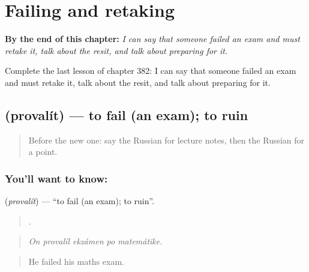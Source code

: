 
\chapter{Failing and retaking}
\label{ch:ru-failing-and-retaking}

\begin{chapteropening}
\textbf{By the end of this chapter:} \emph{I can say that someone failed an exam and must retake it, talk about the resit, and talk about preparing for it.}

Complete the last lesson of chapter 382: I can say that someone failed an exam and must retake it, talk about the resit, and talk about preparing for it.
\end{chapteropening}

\section[\texorpdfstring{\ru{провалить} (provalít)}{провалить (provalít)}]{ (provalít) — to fail (an exam); to ruin}

\label{lesson:RU-C382-provalit}



\begin{quote}
Before the new one: say the Russian for lecture notes, then the Russian for a point.
\end{quote}

\subsection*{You'll want to know: }
\textbf{} (\emph{provalít}) — \textquotedblleft{}to fail (an exam); to ruin\textquotedblright{}.

\begin{quote}
    .
\end{quote}

\begin{quote}
\emph{On provalíl ekzámen po matemátike.}
\end{quote}

\begin{quote}
He failed his maths exam.
\end{quote}


